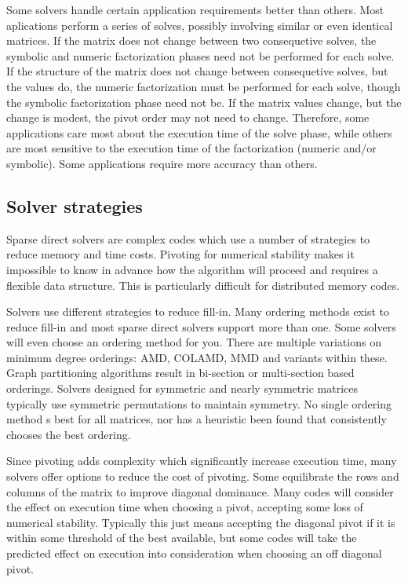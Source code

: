 \documentclass[acmtocl]{acmtrans2m}
\begin{document}
Some solvers handle certain application requirements better than
others.  Most aplications perform a series of solves, possibly
involving similar or even identical matrices.  If the matrix does not
change between two consequetive solves, the symbolic and numeric
factorization phases need not be performed for each solve.  If the
structure of the matrix does not change between consequetive solves,
but the values do, the numeric factorization must be performed for
each solve, though the symbolic factorization phase need not be.  If
the matrix values change, but the change is modest, the pivot order
may not need to change.  Therefore, some applications care most about
the execution time of the solve phase, while others are most sensitive
to the execution time of the factorization (numeric and/or symbolic).
Some applications require more accuracy than others.


\subsection{Solver strategies}

Sparse direct solvers are complex codes which use a number of
strategies to reduce memory and time costs.  Pivoting for numerical
stability makes it impossible to know in advance how the algorithm
will proceed and requires a flexible data structure.  This is
particularly difficult for distributed memory codes.  

Solvers use different strategies to reduce fill-in.  Many ordering
methods exist to reduce fill-in and most sparse direct solvers support
more than one.  Some solvers will even choose an ordering method for
you.  There are multiple variations on minimum degree orderings: AMD,
COLAMD, MMD and variants within these.  Graph partitioning algorithms
result in bi-section or multi-section based orderings.  Solvers
designed for symmetric and nearly symmetric matrices typically use
symmetric permutations to maintain symmetry.  No single ordering
method s best for all matrices, nor has a heuristic been found that
consistently chooses the best ordering.

Since pivoting adds complexity which significantly increase execution
time, many solvers offer options to reduce the cost of pivoting.  Some
equilibrate the rows and columns of the matrix to improve diagonal
dominance.  Many codes will consider the effect on execution time when
choosing a pivot, accepting some loss of numerical stability.
Typically this just means accepting the diagonal pivot if it is within
some threshold of the best available, but some codes will take the
predicted effect on execution into consideration when choosing an off
diagonal pivot.
\end{document}
